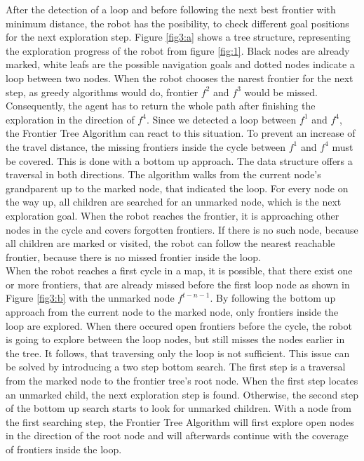 \documentclass[twocolumn]{svjour3}[2016]
\begin{document}
After the detection of a loop and before following the next best frontier with minimum distance, the robot has the posibility, to check different goal positions for the next exploration step. Figure \ref{fig3:a} shows a tree structure, representing the exploration progress of the robot from figure \ref{fig:1}. Black nodes are already marked, white leafs are the possible navigation goals and dotted nodes indicate a loop between two nodes. When the robot chooses the narest frontier for the next step, as greedy algorithms would do, frontier $f^2$ and $f^3$ would be missed. Consequently, the agent has to return the whole path after finishing the exploration in the direction of $f^4$. Since we detected a loop between $f^1$ and $f^4$, the Frontier Tree Algorithm can react to this situation. To prevent an increase of the travel distance, the missing frontiers inside the cycle between $f^1$ and $f^4$ must be covered. This is done with a bottom up approach. The data structure offers a traversal in both directions. The algorithm walks from the current node's grandparent up to the marked node, that indicated the loop. For every node on the way up, all children are searched for an unmarked node, which is the next exploration goal. When the robot reaches the frontier, it is approaching other nodes in the cycle and covers forgotten frontiers. If there is no such node, because all children are marked or visited, the robot can follow the nearest reachable frontier, because there is no missed frontier inside the loop.\\
When the robot reaches a first cycle in a map, it is possible, that there exist one or more frontiers, that are already missed before the first loop node as shown in Figure \ref{fig3:b} with the unmarked node $f^{t-n-1}$. By following the bottom up approach from the current node to the marked node, only frontiers inside the loop are explored. When there occured open frontiers before the cycle, the robot is going to explore between the loop nodes, but still misses the nodes earlier in the tree. It follows, that traversing only the loop is not sufficient. This issue can be solved by introducing a two step bottom search. The first step is a traversal from the marked node to the frontier tree's root node. When the first step locates an unmarked child, the next exploration step is found. Otherwise, the second step of the bottom up search starts to look for unmarked children. With a node from the first searching step, the Frontier Tree Algorithm will first explore open nodes in the direction of the root node and will afterwards continue with the coverage of frontiers inside the loop.
\end{document}
